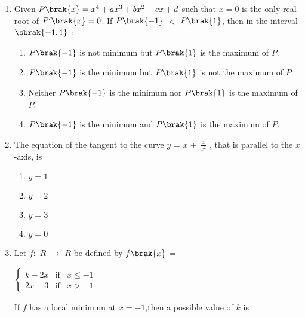 \documentclass[journal,12pt,onecolumn]{IEEEtran}
\theoremstyle{remark}
\begin{document}
\begin{enumerate}
\begin{enumerate}
        \end{enumerate}
        
            
        \item Given $ P\brak{x}=x^4+ ax^3+bx^2+ cx+d$ such that $x = 0$ is the only real root of $P^\prime\brak{x} = 0$. If $P\brak{-1}$ $<$ $P\brak{1}$, then in the interval $\sbrak{-1,1}$ $\colon$ \hfill{}
        
        \begin{enumerate}
        
            
        
            
        \item $P\brak{-1}$ is not minimum but $P\brak{1}$ is the maximum of $P$. 
        \item $P\brak{-1}$ is the minimum but $P\brak{1}$ is not the maximum of $P$. 
        \item  Neither $P\brak{-1}$ is the  minimum nor  $P\brak{1}$ is the maximum of $P$. 
        \item $P\brak{-1}$ is the minimum and $P\brak{1}$ is the maximum of $P$. 
        
        \end{enumerate}
        
            
        \item The equation of the tangent to the curve $y$ = $x$ + $\frac{4}{x^2}$ , that is parallel to the $x$-axis, is\hfill{}
         \begin{multicols}{4}
        \begin{enumerate}
        
            
        
            \item $y=1$
        \item $y=2$
        \item $y=3$
        \item $y=0$
        \end{enumerate}
        \end{multicols}
            
        \item Let $f$$\colon$ $R$ $\to$ $R$ be defined by $f\brak{x}$ = 
    
 $\left\{ \begin{array}{rcl}
     k-2x & \text{if} &  x\leq -1 \\ 2x+3 & \text{if} & x>-1
     \end{array}\right.$
        
        
        If $f$ has a local minimum at $x = -1$,then a possible value of $k$ is\hfill{}
         \begin{multicols}{4}
        

\end{multicols}
\end{enumerate}
\end{document}
